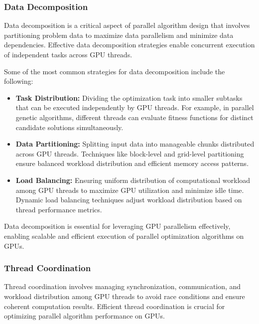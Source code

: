 \documentclass[11pt]{report}
\begin{document}
        \subsubsection{Data Decomposition}
        Data decomposition is a critical aspect of parallel algorithm design that involves partitioning problem data to maximize data parallelism and minimize data dependencies. Effective data decomposition strategies enable concurrent execution of independent tasks across GPU threads.

        Some of the most common strategies for data decomposition include the following:

        \begin{itemize}
            \item \textbf{Task Distribution:} Dividing the optimization task into smaller subtasks that can be executed independently by GPU threads. For example, in parallel genetic algorithms, different threads can evaluate fitness functions for distinct candidate solutions simultaneously.
        
            \item \textbf{Data Partitioning:} Splitting input data into manageable chunks distributed across GPU threads. Techniques like block-level and grid-level partitioning ensure balanced workload distribution and efficient memory access patterns.
        
            \item \textbf{Load Balancing:} Ensuring uniform distribution of computational workload among GPU threads to maximize GPU utilization and minimize idle time. Dynamic load balancing techniques adjust workload distribution based on thread performance metrics.
        \end{itemize}
        
        Data decomposition is essential for leveraging GPU parallelism effectively, enabling scalable and efficient execution of parallel optimization algorithms on GPUs.
        
        \subsubsection{Thread Coordination}
        Thread coordination involves managing synchronization, communication, and workload distribution among GPU threads to avoid race conditions and ensure coherent computation results. Efficient thread coordination is crucial for optimizing parallel algorithm performance on GPUs.
\end{document}
